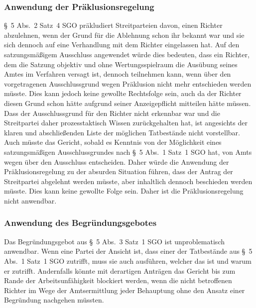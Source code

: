 \subsubsection{Anwendung der Präklusionsregelung}
\label{Zusammensetzung:Spruchkoerper:Befangenheitsvermutung:Praeklusion}
\S~5 Abs.~2 Satz~4 SGO präkludiert Streitparteien davon, einen Richter abzulehnen, wenn der Grund für die Ablehnung schon ihr bekannt war und sie sich dennoch auf eine Verhandlung mit dem Richter eingelassen hat.
Auf den satzungsmäßigem Ausschluss angewendet würde dies bedeuten, dass ein Richter, dem die Satzung objektiv und ohne Wertungsspielraum die Ausübung seines Amtes im Verfahren versagt ist, dennoch teilnehmen kann, wenn über den vorgetragenen Ausschlussgrund wegen Präklusion nicht mehr entschieden werden müsste.
Dies kann jedoch keine gewollte Rechtsfolge sein, auch da der Richter diesen Grund schon hätte aufgrund seiner Anzeigepflicht mitteilen hätte müssen.
Dass der Ausschlussgrund für den Richter nicht erkennbar war und die Streitpartei daher prozesstaktisch Wissen zurückgehalten hat, ist angesichts der klaren und abschließenden Liste der möglichen Tatbestände nicht vorstellbar.
Auch müsste das Gericht, sobald es Kenntnis von der Möglichkeit eines satzungsmäßigen Ausschlussgrundes nach \S~5 Abs.~1 Satz~1 SGO hat, von Amts wegen über den Ausschluss entscheiden.
Daher würde die Anwendung der Präklusionsregelung zu der absurden Situation führen, dass der Antrag der Streitpartei abgelehnt werden müsste, aber inhaltlich dennoch beschieden werden müsste.
Dies kann keine gewollte Folge sein.
Daher ist die Präklusionsregelung nicht anwendbar.

\subsubsection{Anwendung des Begründungsgebotes}
\label{Zusammensetzung:Spruchkoerper:Befangenheitsvermutung:Begruendungsgebot}
Das Begründungsgebot aus \S~5 Abs.~3 Satz~1 SGO ist unproblematisch anwendbar.
Wenn eine Partei der Ansicht ist, dass einer der Tatbestände aus \S~5 Abs.~1 Satz~1 SGO zutrifft, muss sie auch ausführen, welcher das ist und warum er zutrifft.
Andernfalls könnte mit derartigen Anträgen das Gericht bis zum Rande der Arbeitsunfähigkeit blockiert werden, wenn die nicht betroffenen Richter im Wege der Amtsermittlung jeder Behauptung ohne den Ansatz einer Begründung nachgehen müssten.

